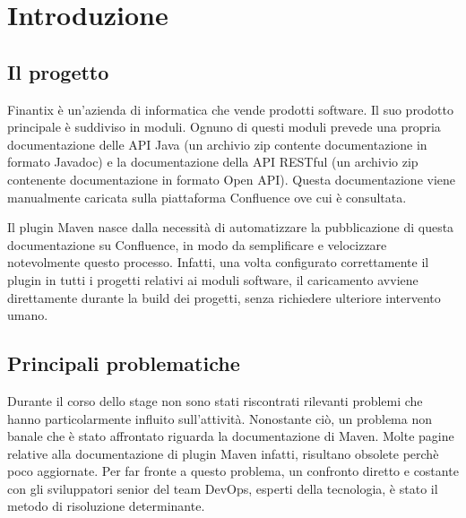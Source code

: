 
\chapter{Introduzione}
\label{cap:introduzione}





\section{Il progetto}
Finantix è un'azienda di informatica che vende prodotti software.
Il suo prodotto principale è suddiviso in moduli.
Ognuno di questi moduli prevede una propria documentazione delle API Java (un archivio zip contente documentazione in formato Javadoc) e la documentazione della API RESTful (un archivio zip contenente documentazione in formato Open API).
Questa documentazione viene manualmente caricata sulla piattaforma Confluence ove cui è consultata.

Il plugin Maven nasce dalla necessità di automatizzare la pubblicazione di questa documentazione su Confluence, in modo da semplificare e velocizzare notevolmente questo processo.
Infatti, una volta configurato correttamente il plugin in tutti i progetti relativi ai moduli software, il caricamento avviene direttamente durante la build dei progetti, senza richiedere ulteriore intervento umano.

\section{Principali problematiche}
Durante il corso dello stage non sono stati riscontrati rilevanti problemi che hanno particolarmente influito sull'attività.
Nonostante ciò, un problema non banale che è stato affrontato riguarda la documentazione di Maven.
Molte pagine relative alla documentazione di plugin Maven infatti, risultano obsolete perchè poco aggiornate.
Per far fronte a questo problema, un confronto diretto e costante con gli sviluppatori senior del team DevOps, esperti della tecnologia, è stato il metodo di risoluzione determinante.


